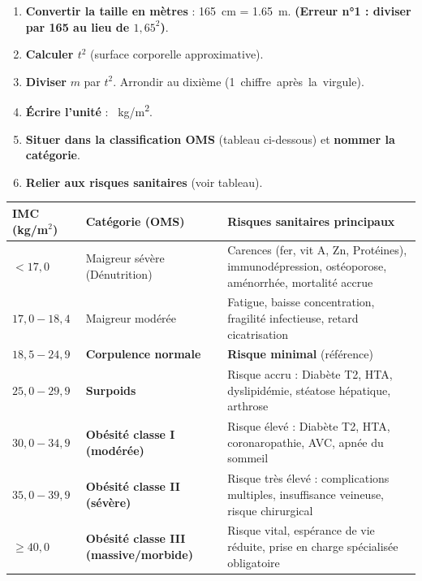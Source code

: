\documentclass[11pt]{article}
\begin{document}
\begin{methode}
\begin{enumerate}
\item \textbf{Convertir la taille en mètres} : \SI{165}{cm} = \SI{1,65}{m}. \textbf{(Erreur n°1 : diviser par 165 au lieu de $1,65^2$)}.
\item \textbf{Calculer $t^2$} (surface corporelle approximative).
\item \textbf{Diviser} $m$ par $t^2$. Arrondir au dixième (\SI{1}{chiffre après la virgule}).
\item \textbf{Écrire l'unité} : \SI{}{kg/m^2}.
\item \textbf{Situer dans la classification OMS} (tableau ci-dessous) et \textbf{nommer la catégorie}.
\item \textbf{Relier aux risques sanitaires} (voir tableau).
\end{enumerate}
\end{methode}

\begin{center}
\begin{tabularx}{\linewidth}{|l|X|X|}\hline
\rowcolor{popblueL} \textbf{IMC (kg/m$^2$)} & \textbf{Catégorie (OMS)} & \textbf{Risques sanitaires principaux} \\ \hline
$< 17,0$ & Maigreur sévère (Dénutrition) & Carences (fer, vit A, Zn, Protéines), immunodépression, ostéoporose, aménorrhée, mortalité accrue \\ \hline
$17,0 - 18,4$ & Maigreur modérée & Fatigue, baisse concentration, fragilité infectieuse, retard cicatrisation \\ \hline
$18,5 - 24,9$ & \textbf{Corpulence normale} & \textbf{Risque minimal} (référence) \\ \hline
$25,0 - 29,9$ & \textbf{Surpoids} & Risque accru : Diabète T2, HTA, dyslipidémie, stéatose hépatique, arthrose \\ \hline
$30,0 - 34,9$ & \textbf{Obésité classe I (modérée)} & Risque élevé : Diabète T2, HTA, coronaropathie, AVC, apnée du sommeil \\ \hline
$35,0 - 39,9$ & \textbf{Obésité classe II (sévère)} & Risque très élevé : complications multiples, insuffisance veineuse, risque chirurgical \\ \hline
$\ge 40,0$ & \textbf{Obésité classe III (massive/morbide)} & Risque vital, espérance de vie réduite, prise en charge spécialisée obligatoire \\ \hline
\end{tabularx}
\end{center}
\end{document}
